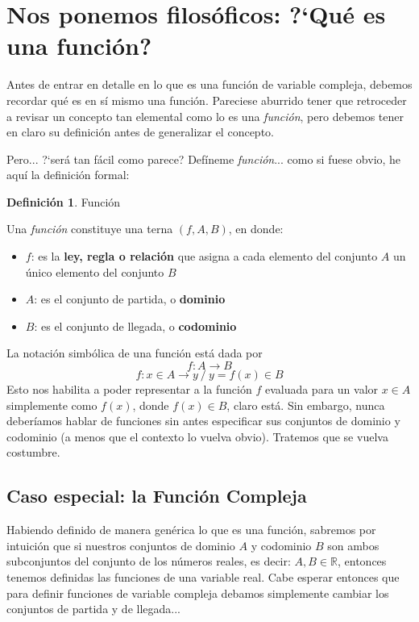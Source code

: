 \documentclass[12pt]{article}
\theoremstyle{definition}
\newtheorem{definition}{Definici\'on}[section]
\theoremstyle{theorem}
\begin{document}
\pagebreak
\tableofcontents
\pagebreak

\section{Nos ponemos filos\'oficos: ?`Qu\'e es una funci\'on?}
Antes de entrar en detalle en lo que es una funci\'on de variable compleja, debemos recordar qu\'e es en s\'i mismo una funci\'on. Pareciese aburrido tener que retroceder a revisar un concepto tan elemental como lo es una \textit{funci\'on}, pero debemos tener en claro su definici\'on antes de generalizar el concepto.

Pero... ?`ser\'a tan f\'acil como parece? Def\'ineme \textit{funci\'on}... como si fuese obvio, he aqu\'i la definici\'on formal:\\

\colorbox{magenta!40!white!80}{\parbox{\linewidth}{
\theoremstyle{definition}
\begin{definition}{Funci\'on}

Una \textit{funci\'on} constituye una terna $(f, A, B)$, en donde:
\begin{itemize}
	\item $f$: es la \textbf{ley, regla o relaci\'on} que asigna a cada elemento del conjunto $A$ un \'unico elemento del conjunto $B$
	\item $A$: es el conjunto de partida, o \textbf{dominio}
	\item $B$: es el conjunto de llegada, o \textbf{codominio}
\end{itemize}
\end{definition}
}}
\linebreak
\linebreak

La notaci\'on simb\'olica de una funci\'on est\'a dada por
$$f:A\to B$$
$$f: x\in A \to y\ /\ y=f(x)\in B$$
Esto nos habilita a poder representar a la funci\'on $f$ evaluada para un valor $x\in A$ simplemente como $f(x)$, donde $f(x)\in B$, claro est\'a. Sin embargo, nunca deber\'iamos hablar de funciones sin antes especificar sus conjuntos de dominio y codominio (a menos que el contexto lo vuelva obvio). Tratemos que se vuelva costumbre.

\subsection{Caso especial: la Funci\'on Compleja}
Habiendo definido de manera gen\'erica lo que es una funci\'on, sabremos por intuici\'on que si nuestros conjuntos de dominio $A$ y codominio $B$ son ambos subconjuntos del conjunto de los n\'umeros reales, es decir: $A, B \in \mathbb{R}$, entonces tenemos definidas las funciones de una variable real. Cabe esperar entonces que para definir funciones de variable compleja debamos simplemente cambiar los conjuntos de partida y de llegada...\\
\end{document}
